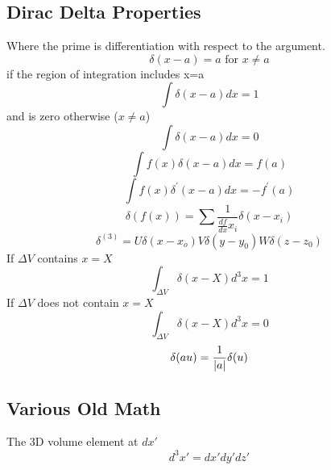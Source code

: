 \documentclass[12pt]{article}
\begin{document}
\subsection{Dirac Delta Properties} \label{subsection1-2}
    Where the prime is differentiation with respect to the argument.
    \begin{equation} \label{eq: 1-2-1}
        \delta(x-a) = a  \mbox{ for } x \neq a
    \end{equation}
    if the region of integration includes x=a
    \begin{equation} \label{eq: 1-2-2}
        \int \delta(x-a)dx = 1 
    \end{equation}
    and is zero otherwise  ($x \neq a$)
    \begin{equation} \label{eq: 1-2-3}
        \int \delta(x-a)dx = 0
    \end{equation}
    \begin{equation} \label{eq: 1-2-4}
        \int f(x) \delta(x-a) dx = f(a)
    \end{equation}
    \begin{equation} \label{eq: 1-2-5}
        \int f(x) \delta^{'}(x-a)dx = -f^{'}(a)
    \end{equation}
    \begin{equation} \label{eq: 1-2-6}
        \delta(f(x)) = \sum \frac{1}{\frac{df}{dx}x_i} \delta(x-x_i)
    \end{equation}
    \begin{equation} \label{eq: 1-2-7}
        \delta^{(3)}=U \delta(x-x_o) V \delta(y-y_0) W \delta(z-z_0)
    \end{equation}
    If $\Delta V$ contains $x=X$
    \begin{equation} \label{eq: 1-2-8}
        \int_{\Delta V} \delta(x-X) d^3 x = 1
    \end{equation}
    If $\Delta V$ does not contain $x=X$
    \begin{equation} \label{eq: 1-2-9}
        \int_{\Delta V} \delta(x-X) d^3 x = 0
    \end{equation}
    \begin{equation} \label{eq: 1-2-10}
        \delta(au)=\frac{1}{\abs{a}} \delta(u)
    \end{equation}

\subsection{Various Old Math} \label{section1-3}
    The 3D volume element at $dx'$
    \begin{equation} \label{eq: 1-3-1}
        d^3x' = dx' dy' dz'    
    \end{equation}
    
\end{document}
